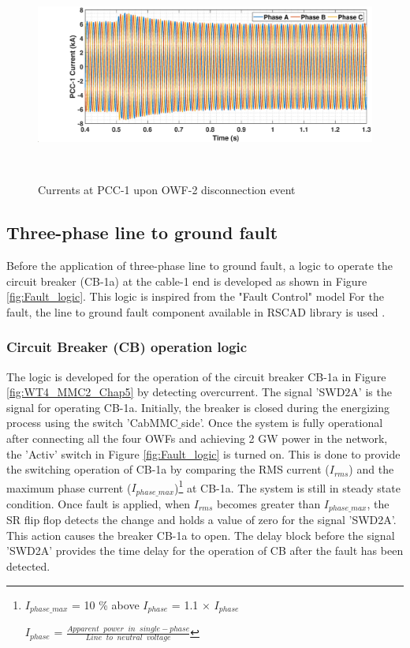 \begin{figure}[H]
    \includegraphics[height = 7cm,width = \textwidth]{Diagrams/Chapter_5/IABC_WT1_WT2off.eps}
    \caption{Currents at PCC-1 upon OWF-2 disconnection event}
    \label{IABC_WT1_WT2off}
\end{figure}

\subsection{Three-phase line to ground fault}

Before the application of three-phase line to ground fault, a logic to operate the circuit breaker (CB-1a) at the cable-1 end is developed as shown in Figure \ref{fig:Fault_logic}. This logic is inspired from the "Fault Control" model 
For the fault, the line to ground fault component available in RSCAD library is used \cite{rtds_tech}.

\subsubsection{Circuit Breaker (CB) operation logic}\label{Fault logic and cb}
The logic is developed for the operation of the circuit breaker CB-1a in Figure \ref{fig:WT4_MMC2_Chap5} by detecting overcurrent. The signal 'SWD2A' is the signal for operating CB-1a. Initially, the breaker is closed during the energizing process using the switch 'CabMMC$\_$side'. Once the system is fully operational after connecting all the four \gls{OWF}s and achieving 2 GW power in the network, the 'Activ' switch in Figure \ref{fig:Fault_logic} is turned on. This is done to provide the switching operation of CB-1a by comparing the RMS current ($I_{rms}$) and the maximum phase current ($I_{phase\_max}$)\footnote{$I_{phase\_max}$ = 10 \% above $I_{phase}$ = 1.1 $\times$ $I_{phase}$

$I_{phase}$ = $\frac{Apparent \;\; power \;\; in \;\; single-phase}{Line \;\; to \;\; neutral \;\; voltage}$} at CB-1a. The system is still in steady state condition. Once fault is applied, when $I_{rms}$ becomes greater than $I_{phase\_max}$, the SR flip flop detects the change and holds a value of zero for the signal 'SWD2A'. This action causes the breaker CB-1a to open. The delay block before the signal 'SWD2A' provides the time delay for the operation of \gls{CB} after the fault has been detected.

